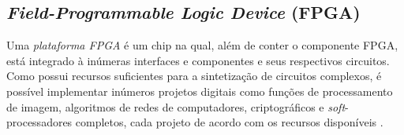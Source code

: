    \subsection{\textit{Field-Programmable Logic Device} (FPGA)}

      Uma \textit{plataforma FPGA} é um chip na qual, além de conter o componente FPGA, está integrado à inúmeras interfaces e componentes e seus respectivos circuitos.
      Como possui recursos suficientes para a sintetização de circuitos complexos, é possível implementar inúmeros projetos digitais como funções de processamento de imagem, algoritmos de redes de computadores, criptográficos e \textit{soft}-processadores completos, cada projeto de acordo com os recursos disponíveis \cite{Plessl2003}.


